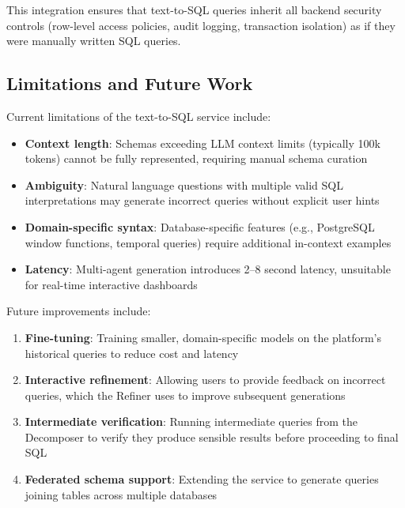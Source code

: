 This integration ensures that text-to-SQL queries inherit all backend security controls (row-level access policies, audit logging, transaction isolation) as if they were manually written SQL queries.

\subsection{Limitations and Future Work}

Current limitations of the text-to-SQL service include:

\begin{itemize}
    \item \textbf{Context length}: Schemas exceeding LLM context limits (typically 100k tokens) cannot be fully represented, requiring manual schema curation
    \item \textbf{Ambiguity}: Natural language questions with multiple valid SQL interpretations may generate incorrect queries without explicit user hints
    \item \textbf{Domain-specific syntax}: Database-specific features (e.g., PostgreSQL window functions, temporal queries) require additional in-context examples
    \item \textbf{Latency}: Multi-agent generation introduces 2--8 second latency, unsuitable for real-time interactive dashboards
\end{itemize}

Future improvements include:

\begin{enumerate}
    \item \textbf{Fine-tuning}: Training smaller, domain-specific models on the platform's historical queries to reduce cost and latency
    \item \textbf{Interactive refinement}: Allowing users to provide feedback on incorrect queries, which the Refiner uses to improve subsequent generations
    \item \textbf{Intermediate verification}: Running intermediate queries from the Decomposer to verify they produce sensible results before proceeding to final SQL
    \item \textbf{Federated schema support}: Extending the service to generate queries joining tables across multiple databases
\end{enumerate}
